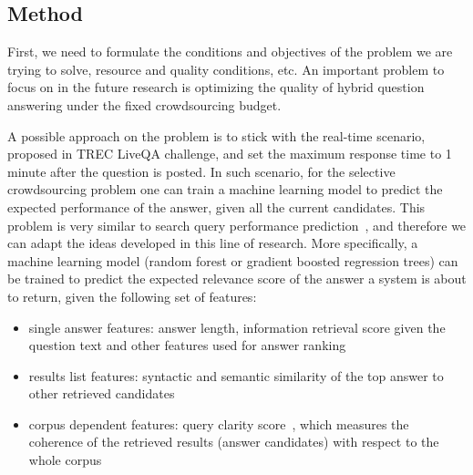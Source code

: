 
\subsection{Method}
\label{section:crowdsourcing:method}

First, we need to formulate the conditions and objectives of the problem we are trying to solve, \ie resource and quality conditions, etc.
An important problem to focus on in the future research is optimizing the quality of hybrid question answering under the fixed crowdsourcing budget.

A possible approach on the problem is to stick with the real-time scenario, proposed in TREC LiveQA challenge, and set the maximum response time to 1 minute after the question is posted.
In such scenario, for the selective crowdsourcing problem one can train a machine learning model to predict the expected performance of the answer, given all the current candidates.
This problem is very similar to search query performance prediction~\cite{carmel2010estimating,he2006query,zhou2007query}, and therefore we can adapt the ideas developed in this line of research.
More specifically, a machine learning model (\eg random forest or gradient boosted regression trees) can be trained to predict the expected relevance score of the answer a system is about to return, given the following set of features:
\begin{itemize}
\item single answer features: answer length, information retrieval score given the question text and other features used for answer ranking
\item results list features: syntactic and semantic similarity of the top answer to other retrieved candidates
\item corpus dependent features: query clarity score~\cite{cronen2002predicting}, which measures the coherence of the retrieved results (answer candidates) with respect to the whole corpus
\end{itemize}

